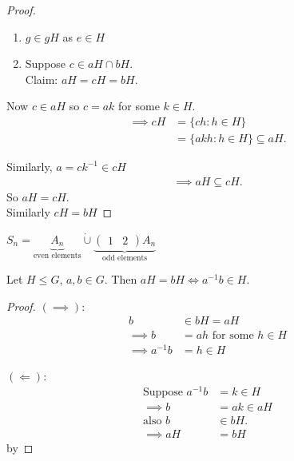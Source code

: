 \begin{proof} \mbox{}
    \begin{enumerate}
    \def\labelenumi{\roman{enumi}.}
        \item
        \(g \in gH\) as \(e \in H\)
        \item
        Suppose \(c \in aH \cap bH\).\\
        Claim: \(aH = cH = bH\).
    \end{enumerate}

    Now \(c \in aH\) so \(c = ak\) for some \(k \in H\).
    \begin{align*}
        \implies cH &= \{ c h : h \in H \} \\
        &= \{ a k h : h \in H \} \subseteq aH.
    \end{align*}

    Similarly, \(a = c k^{-1} \in cH\)
    \begin{align*}
        \implies aH \subseteq cH.
    \end{align*}
    So \(aH = cH\).\\
    Similarly \(cH = bH\)
\end{proof}

\begin{example}
\(S_n = \underbrace{A_n}_\text{even elements} \mathbin{\dot{\cup}} \underbrace{\begin{pmatrix}1 & 2\end{pmatrix} A_n}_\text{odd elements}\)
\end{example}

\begin{lemma}
\protect\hypertarget{lem:eleven}{}\label{lem:eleven}
Let \(H \leq G\), \(a, b \in G\).
Then \(aH = bH \iff a^{-1} b \in H\).
\end{lemma}

\begin{proof}
\((\implies)\):
\begin{align*}
    b &\in bH = aH \\
    \implies b &= ah \text{ for some } h \in H \\
    \implies a^{-1} b &= h \in H
\end{align*}

\((\Longleftarrow)\):
\begin{align*}
    \text{Suppose } a^{-1}b &= k \in H \\
    \implies b &= ak \in aH \\
    \text{also } b &\in bH. \\
    \implies aH &= bH
\end{align*} by 
\end{proof}

